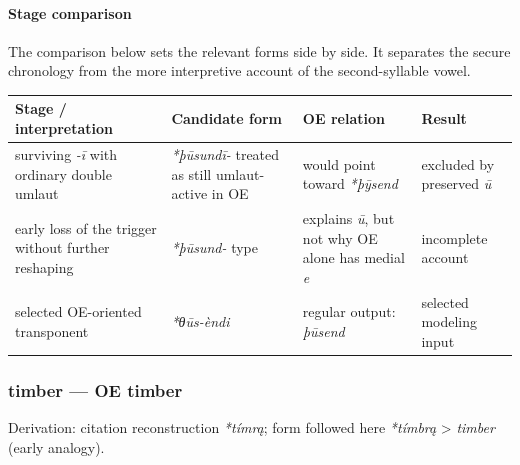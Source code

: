 \documentclass[
  british,
  a4paper,
]{article}
\newcounter{none} %
\begin{document}
\paragraph{Stage comparison}\label{stage-comparison-1}

The comparison below sets the relevant forms side by side. It separates
the secure chronology from the more interpretive account of the
second-syllable vowel.

{\def\LTcaptype{none} %
\begin{longtable}[]{@{}
  >{\raggedright\arraybackslash}p{}
  >{\raggedright\arraybackslash}p{}
  >{\raggedright\arraybackslash}p{}
  >{\raggedright\arraybackslash}p{}@{}}
\toprule\noalign{}
\begin{minipage}[b]{\linewidth}\raggedright
Stage / interpretation
\end{minipage} & \begin{minipage}[b]{\linewidth}\raggedright
Candidate form
\end{minipage} & \begin{minipage}[b]{\linewidth}\raggedright
OE relation
\end{minipage} & \begin{minipage}[b]{\linewidth}\raggedright
Result
\end{minipage} \\
\midrule\noalign{}
\endhead
\bottomrule\noalign{}
\endlastfoot
surviving \emph{-ī} with ordinary double umlaut & \emph{*þūsundī-}
treated as still umlaut-active in OE & would point toward \emph{*þȳsend}
& excluded by preserved \emph{ū} \\
early loss of the trigger without further reshaping & \emph{*þūsund-}
type & explains \emph{ū}, but not why OE alone has medial \emph{e} &
incomplete account \\
selected OE-oriented transponent & \emph{*θūs-èndi} & regular output:
\emph{þūsend} & selected modeling input \\
\end{longtable}
}

\subsubsection{timber --- OE timber}\label{timber-oe-timber}

Derivation: citation reconstruction \emph{*tímrą}; form followed here
\emph{*tímbrą} \textgreater{} \emph{timber} (early analogy).
\end{document}
